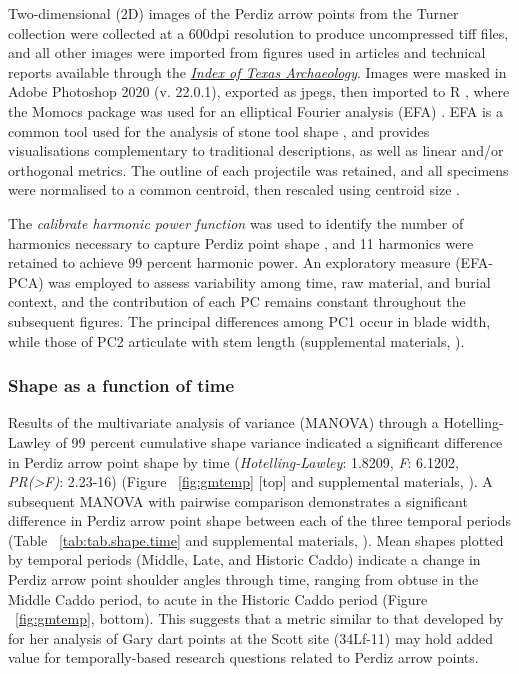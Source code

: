 \documentclass[review]{elsarticle}
\begin{document}
Two-dimensional (2D) images of the Perdiz arrow points from the Turner collection were collected at a 600dpi resolution to produce uncompressed tiff files, and all other images were imported from figures used in articles and technical reports available through the \href{https://scholarworks.sfasu.edu/ita/}{\textit{Index of Texas Archaeology}}. Images were masked in Adobe Photoshop 2020 (v. 22.0.1), exported as jpegs, then imported to R \citep{RN8584}, where the Momocs package was used for an elliptical Fourier analysis (EFA) \citep{RN8925}. EFA is a common tool used for the analysis of stone tool shape \citep{RN2805,RN9003,RN6313,RN5230,RN5225,RN5227,RN8358,RN8967,RN5231,RN7164,RN9004}, and provides visualisations complementary to traditional descriptions, as well as linear and/or orthogonal metrics. The outline of each projectile was retained, and all specimens were normalised to a common centroid, then rescaled using centroid size \citep{RN8923}. 

The \textit{calibrate harmonic power function} was used to identify the number of harmonics necessary to capture Perdiz point shape  \citep{RN8925}, and 11 harmonics were retained to achieve 99 percent harmonic power. An exploratory measure (EFA-PCA) was employed to assess variability among time, raw material, and burial context, and the contribution of each PC remains constant throughout the subsequent figures. The principal differences among PC1 occur in blade width, while those of PC2 articulate with stem length (supplemental materials,  \citealt[Chapter 4]{RN8980}).

\subsubsection*{Shape as a function of time}

Results of the multivariate analysis of variance (MANOVA) through a Hotelling-Lawley of 99 percent cumulative shape variance indicated a significant difference in Perdiz arrow point shape by time (\textit{Hotelling-Lawley}: 1.8209, \textit{F}: 6.1202, \textit{PR(>F)}: 2.23-16) (Figure ~\ref{fig:gmtemp} [top] and supplemental materials, \citealt[Chapter 4]{RN8980}). A subsequent MANOVA with pairwise comparison demonstrates a significant difference in Perdiz arrow point shape between each of the three temporal periods (Table ~\ref{tab:tab.shape.time} and supplemental materials, \citealt[Chapter 4]{RN8980}). Mean shapes plotted by temporal periods (Middle, Late, and Historic Caddo) indicate a change in Perdiz arrow point shoulder angles through time, ranging from obtuse in the Middle Caddo period, to acute in the Historic Caddo period (Figure ~\ref{fig:gmtemp}, bottom). This suggests that a metric similar to that developed by \citet{RN8275} for her analysis of Gary dart points at the Scott site (34Lf-11) may hold added value for temporally-based research questions related to Perdiz arrow points.
\end{document}
